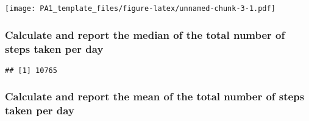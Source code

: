 \documentclass[
]{article}
\newenvironment{Shaded}{\begin{snugshade}}{\end{snugshade}}
\newcommand{\DataTypeTok}[1]{\textcolor[rgb]{0.13,0.29,0.53}{#1}}
\newcommand{\DecValTok}[1]{\textcolor[rgb]{0.00,0.00,0.81}{#1}}
\newcommand{\KeywordTok}[1]{\textcolor[rgb]{0.13,0.29,0.53}{\textbf{#1}}}
\newcommand{\NormalTok}[1]{#1}
\newcommand{\OperatorTok}[1]{\textcolor[rgb]{0.81,0.36,0.00}{\textbf{#1}}}
\newcommand{\StringTok}[1]{\textcolor[rgb]{0.31,0.60,0.02}{#1}}
\begin{document}
\begin{Shaded}
\end{Shaded}

\texttt{[image: PA1\_template\_files/figure-latex/unnamed-chunk-3-1.pdf]}

\hypertarget{calculate-and-report-the-median-of-the-total-number-of-steps-taken-per-day}{%
\subsubsection{Calculate and report the median of the total number of
steps taken per
day}\label{calculate-and-report-the-median-of-the-total-number-of-steps-taken-per-day}}

\begin{Shaded}
\end{Shaded}

\begin{verbatim}
## [1] 10765
\end{verbatim}

\hypertarget{calculate-and-report-the-mean-of-the-total-number-of-steps-taken-per-day}{%
\subsubsection{Calculate and report the mean of the total number of
steps taken per
day}\label{calculate-and-report-the-mean-of-the-total-number-of-steps-taken-per-day}}

\begin{Shaded}
\end{Shaded}
\end{document}
